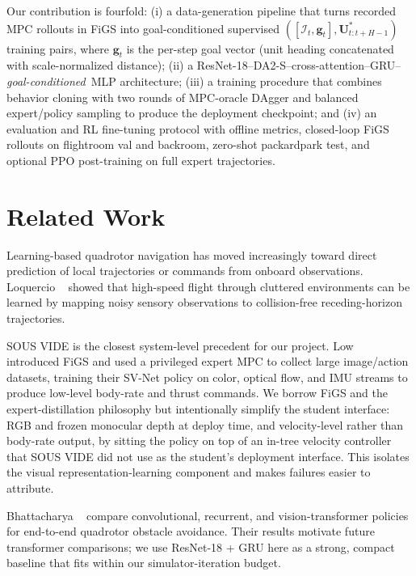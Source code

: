 \documentclass[10pt,twocolumn,letterpaper]{article}
\begin{document}
Our contribution is fourfold: (i) a data-generation pipeline that turns recorded MPC rollouts in FiGS into goal-conditioned supervised $([\mathcal{I}_t,\mathbf{g}_t], \mathbf{U}^{*}_{t:t+H-1})$ training pairs, where $\mathbf{g}_t$ is the per-step goal vector (unit heading concatenated with scale-normalized distance); (ii) a ResNet-18--DA2-S--cross-attention--GRU--\emph{goal-conditioned}~MLP architecture; (iii) a training procedure that combines behavior cloning with two rounds of MPC-oracle DAgger and balanced expert/policy sampling to produce the deployment checkpoint; and (iv) an evaluation and RL fine-tuning protocol with offline metrics, closed-loop FiGS rollouts on flightroom val and backroom, zero-shot packardpark test, and optional PPO post-training on full expert trajectories.

\section{Related Work}
\label{sec:related}

Learning-based quadrotor navigation has moved increasingly toward direct prediction of local trajectories or commands from onboard observations. Loquercio \etal~\cite{loquercio2021learning} showed that high-speed flight through cluttered environments can be learned by mapping noisy sensory observations to collision-free receding-horizon trajectories.

SOUS VIDE is the closest system-level precedent for our project. Low \etal~\cite{low2024sousvide} introduced FiGS and used a privileged expert MPC to collect large image/action datasets, training their SV-Net policy on color, optical flow, and IMU streams to produce low-level body-rate and thrust commands. We borrow FiGS and the expert-distillation philosophy but intentionally simplify the student interface: RGB and frozen monocular depth at deploy time, and velocity-level rather than body-rate output, by sitting the policy on top of an in-tree velocity controller that SOUS VIDE did not use as the student's deployment interface. This isolates the visual representation-learning component and makes failures easier to attribute.

Bhattacharya \etal~\cite{bhattacharya2024vision} compare convolutional, recurrent, and vision-transformer policies for end-to-end quadrotor obstacle avoidance. Their results motivate future transformer comparisons; we use ResNet-18 + GRU here as a strong, compact baseline that fits within our simulator-iteration budget.
\end{document}
